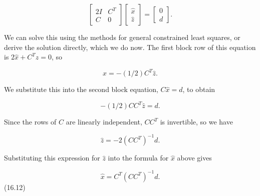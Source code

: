 \[\left[\begin{array}{cc}2I&C^{T}\\ C&0\end{array}\right]\left[\begin{array}{c}\hat{x}\\ \hat{z}\end{array}\right]=\left[\begin{array}{c}0\\ d\end{array}\right].\]

We can solve this using the methods for general constrained least squares, or derive the solution directly, which we do now. The first block row of this equation is \(2\hat{x}+C^{T}\hat{z}=0\), so

\[\hat{x}=-(1/2)C^{T}\hat{z}.\]

We substitute this into the second block equation, \(C\hat{x}=d\), to obtain

\[-(1/2)CC^{T}\hat{z}=d.\]

Since the rows of \(C\) are linearly independent, \(CC^{T}\) is invertible, so we have

\[\hat{z}=-2(CC^{T})^{-1}d.\]

Substituting this expression for \(\hat{z}\) into the formula for \(\hat{x}\) above gives

\[\hat{x}=C^{T}(CC^{T})^{-1}d.\] (16.12) 